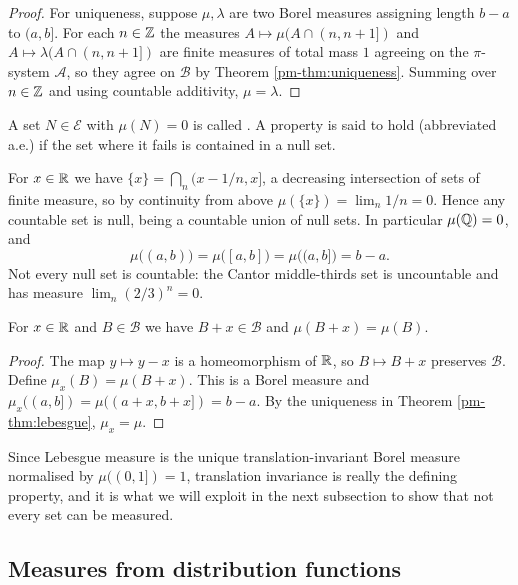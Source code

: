\documentclass[a4paper]{scrartcl}
\newcommand{\cA}{\mathcal{A}}
\newcommand{\cB}{\mathcal{B}}
\newcommand{\cE}{\mathcal{E}}
\begin{document}
\begin{proof}
	For uniqueness, suppose $\mu, \lambda$ are two Borel measures assigning length $b-a$ to $(a,b]$. For each $n \in \mathbb{Z}$ the measures $A \mapsto \mu(A \cap (n, n+1])$ and $A \mapsto \lambda(A \cap (n,n+1])$ are finite measures of total mass $1$ agreeing on the $\pi$-system $\cA$, so they agree on $\cB$ by Theorem \ref{pm-thm:uniqueness}. Summing over $n \in \mathbb{Z}$ and using countable additivity, $\mu = \lambda$.
\end{proof}

\begin{definition}
	A set $N \in \cE$ with $\mu(N) = 0$ is called . A property is said to hold  (abbreviated a.e.) if the set where it fails is contained in a null set.
\end{definition}

\begin{example}
	For $x \in \mathbb{R}$ we have $\{x\} = \bigcap_n (x - 1/n, x]$, a decreasing intersection of sets of finite measure, so by continuity from above $\mu(\{x\}) = \lim_n 1/n = 0$. Hence any countable set is null, being a countable union of null sets. In particular $\mu(\mathbb{Q}) = 0$, and
	$$
	\mu\big((a,b)\big) = \mu\big([a,b]\big) = \mu\big((a,b]\big) = b - a.
	$$
	Not every null set is countable: the Cantor middle-thirds set is uncountable and has measure $\lim_n (2/3)^n = 0$.
\end{example}

\begin{proposition}
	For $x \in \mathbb{R}$ and $B \in \cB$ we have $B + x \in \cB$ and $\mu(B+x) = \mu(B)$.
\end{proposition}
\begin{proof}
	The map $y \mapsto y - x$ is a homeomorphism of $\mathbb{R}$, so $B \mapsto B + x$ preserves $\cB$. Define $\mu_x(B) = \mu(B+x)$. This is a Borel measure and $\mu_x((a,b]) = \mu((a+x, b+x]) = b-a$. By the uniqueness in Theorem \ref{pm-thm:lebesgue}, $\mu_x = \mu$.
\end{proof}

Since Lebesgue measure is the unique translation-invariant Borel measure normalised by $\mu((0,1]) = 1$, translation invariance is really the defining property, and it is what we will exploit in the next subsection to show that not every set can be measured.

\subsection{Measures from distribution functions}
\end{document}
